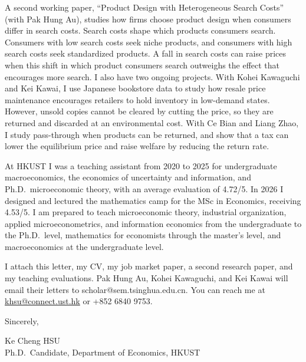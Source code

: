 \documentclass[11pt]{article}
\begin{document}
A second working paper, ``Product Design with Heterogeneous Search Costs'' (with Pak Hung Au), studies how firms choose product design when consumers differ in search costs. Search costs shape which products consumers search. Consumers with low search costs seek niche products, and consumers with high search costs seek standardized products. A fall in search costs can raise prices when this shift in which product consumers search outweighs the effect that encourages more search. I also have two ongoing projects. With Kohei Kawaguchi and Kei Kawai, I use Japanese bookstore data to study how resale price maintenance encourages retailers to hold inventory in low-demand states. However, unsold copies cannot be cleared by cutting the price, so they are returned and discarded at an environmental cost. With Ce Bian and Liang Zhao, I study pass-through when products can be returned, and show that a tax can lower the equilibrium price and raise welfare by reducing the return rate.

At HKUST I was a teaching assistant from 2020 to 2025 for undergraduate macroeconomics, the economics of uncertainty and information, and Ph.D.\ microeconomic theory, with an average evaluation of 4.72/5. In 2026 I designed and lectured the mathematics camp for the MSc in Economics, receiving 4.53/5. I am prepared to teach microeconomic theory, industrial organization, applied microeconometrics, and information economics from the undergraduate to the Ph.D.\ level, mathematics for economists through the master's level, and macroeconomics at the undergraduate level.

I attach this letter, my CV, my job market paper, a second research paper, and my teaching evaluations. Pak Hung Au, Kohei Kawaguchi, and Kei Kawai will email their letters to scholar@sem.tsinghua.edu.cn. You can reach me at \href{mailto:khsu@connect.ust.hk}{khsu@connect.ust.hk} or +852 6840 9753.

\vspace{0.25em}
Sincerely,

\vspace{0.25em}
Ke Cheng HSU \\
Ph.D.\ Candidate, Department of Economics, HKUST
\end{document}

